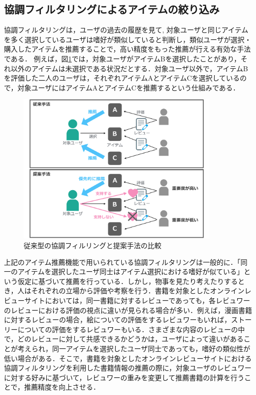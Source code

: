 \documentclass[a4paper,11pt,oneside,openany]{jsbook}
\begin{document}
\subsection{協調フィルタリングによるアイテムの絞り込み}
協調フィルタリングは，ユーザの過去の履歴を見て, 対象ユーザと同じアイテムを多く選択しているユーザは嗜好が類似していると判断し，類似ユーザが選択・購入したアイテムを推薦することで，高い精度をもった推薦が行える有効な手法である．
例えば，図\ref{fig:kyocho}では，対象ユーザがアイテムBを選択したことがあり，それ以外のアイテムは未選択である状況だとする．対象ユーザ以外で，アイテムBを評価した二人のユーザは，それぞれアイテムAとアイテムCを選択しているので，対象ユーザにはアイテムAとアイテムCを推薦するという仕組みである．
\begin{figure}[htb]
	\begin{center} %
		\includegraphics[width = 100mm]{figures/compare.pdf} %
	\end{center}
	\caption{従来型の協調フィルリングと提案手法の比較} %
	\label{fig:kyocho} %
\end{figure}
\par
上記のアイテム推薦機能で用いられている協調フィルタリングは一般的に．「同一のアイテムを選択したユーザ同士はアイテム選択における嗜好が似ている」という仮定に基づいて推薦を行っている．しかし，物事を見たり考えたりするとき，人はそれぞれの立場から評価や考察を行う．書籍を対象としたオンラインレビューサイトにおいては，同一書籍に対するレビューであっても，各レビュワーのレビューにおける評価の視点に違いが見られる場合が多い．例えば，漫画書籍に対するレビューの場合，絵についての評価をするレビュワーもいれば，ストーリーについての評価をするレビュワーもいる．さまざまな内容のレビューの中で，どのレビューに対して共感できるかどうかは，ユーザによって違いがあることが考えられ，同一アイテムを選択したユーザ同士であっても，嗜好の類似性が低い場合がある．そこで，書籍を対象としたオンラインレビューサイトにおける協調フィルタリングを利用した書籍情報の推薦の際に，対象ユーザのレビュワーに対する好みに基づいて，レビュワーの重みを変更して推薦書籍の計算を行うことで，推薦精度を向上させる．
\end{document}
